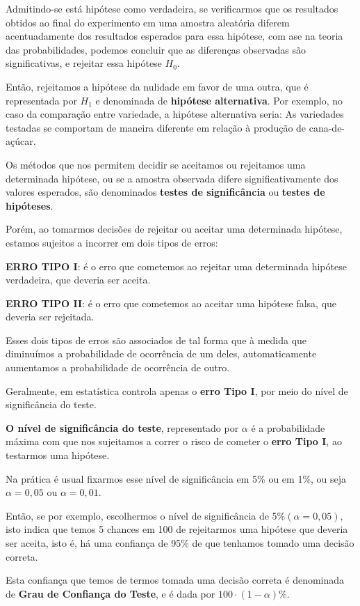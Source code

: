 \documentclass[
]{book}
\begin{document}
Admitindo-se está hipótese como verdadeira, se verificarmos que os resultados obtidos ao final do experimento em uma amostra aleatória diferem acentuadamente dos resultados esperados para essa hipótese, com ase na teoria das probabilidades, podemos concluir que as diferenças observadas são significativas, e rejeitar essa hipótese \(H_0\).

Então, rejeitamos a hipótese da nulidade em favor de uma outra, que é representada por \(H_1\) e denominada de \textbf{hipótese alternativa}. Por exemplo, no caso da comparação entre variedade, a hipótese alternativa seria: As variedades testadas se comportam de maneira diferente em relação à produção de cana-de-açúcar.

Os métodos que nos permitem decidir se aceitamos ou rejeitamos uma determinada hipótese, ou se a amostra observada difere significativamente dos valores esperados, são denominados \textbf{testes de significância} ou \textbf{testes de hipóteses}.

Porém, ao tomarmos decisões de rejeitar ou aceitar uma determinada hipótese, estamos sujeitos a incorrer em dois tipos de erros:

\textbf{ERRO TIPO I}: é o erro que cometemos ao rejeitar uma determinada hipótese verdadeira, que deveria ser aceita.

\textbf{ERRO TIPO II}: é o erro que cometemos ao aceitar uma hipótese falsa, que deveria ser rejeitada.

Esses dois tipos de erros são associados de tal forma que à medida que diminuímos a probabilidade de ocorrência de um deles, automaticamente aumentamos a probabilidade de ocorrência de outro.

Geralmente, em estatística controla apenas o \textbf{erro Tipo I}, por meio do nível de significância do teste.

\textbf{O nível de significância do teste}, representado por \(\alpha\) é a probabilidade máxima com que nos sujeitamos a correr o risco de cometer o \textbf{erro Tipo I}, ao testarmos uma hipótese.

Na prática é usual fixarmos esse nível de significância em 5\% ou em 1\%, ou seja \(\alpha = 0,05\) ou \(\alpha = 0,01\).

Então, se por exemplo, escolhermos o nível de significância de 5\%\((\alpha=0,05)\), isto indica que temos 5 chances em 100 de rejeitarmos uma hipótese que deveria ser aceita, isto é, há uma confiança de 95\% de que tenhamos tomado uma decisão correta.

Esta confiança que temos de termos tomada uma decisão correta é denominada de \textbf{Grau de Confiança do Teste}, e é dada por \(100 \cdot (1-\alpha) \%\).
\end{document}
